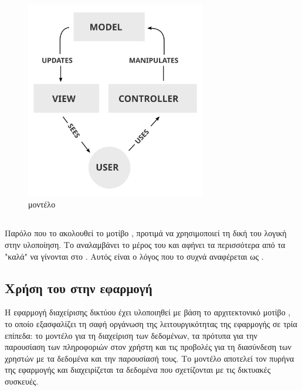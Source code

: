\begin{figure}[h]
	\centering
	\includegraphics[width=0.7\textwidth]{graphics/MVC-Process.svg.png}
	\caption{ μοντέλο}
\end{figure}

\subsection{ }

Παρόλο που το  ακολουθεί το μοτίβο , προτιμά να χρησιμοποιεί τη δική του λογική στην υλοποίηση. Το  αναλαμβάνει το  
μέρος του  και αφήνει τα περισσότερα από τα "καλά" να γίνονται στο .
Αυτός είναι ο λόγος που το  συχνά αναφέρεται ως .



\subsection{Χρήση του  στην εφαρμογή}

Η εφαρμογή διαχείρισης δικτύου έχει υλοποιηθεί με βάση το 
αρχιτεκτονικό μοτίβο , το οποίο 
εξασφαλίζει τη σαφή οργάνωση της λειτουργικότητας της εφαρμογής σε 
τρία επίπεδα: το μοντέλο για τη διαχείριση των δεδομένων, τα πρότυπα 
για την παρουσίαση των πληροφοριών στον χρήστη και τις προβολές για 
τη διασύνδεση των χρηστών με τα δεδομένα και την παρουσίασή τους.
Το μοντέλο αποτελεί τον πυρήνα της εφαρμογής και διαχειρίζεται τα 
δεδομένα που σχετίζονται με τις δικτυακές συσκευές. 

